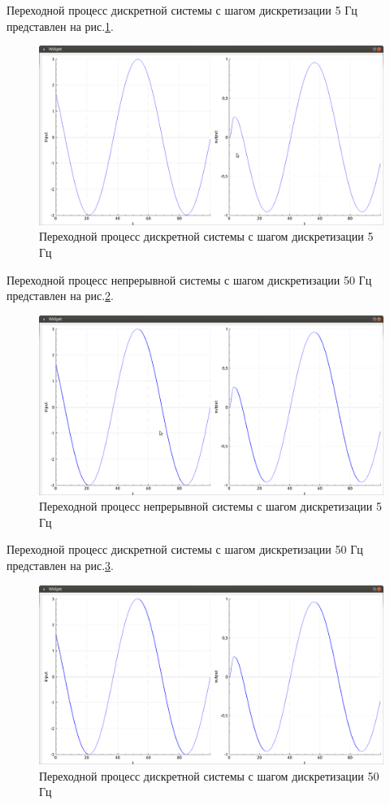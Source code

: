 \documentclass[14pt,a4paper]{extreport}
\begin{document}
Переходной процесс дискретной системы с шагом дискретизации 
5 Гц представлен на рис.\ref{fig:dis_5hz}.
\begin{figure}[H]
    \centering
    \includegraphics[width=160mm]{img/dis_5hz.png}
    \caption{Переходной процесс дискретной системы 
    с шагом дискретизации 5 Гц}
    \label{fig:dis_5hz}
\end{figure}

Переходной процесс непрерывной системы с шагом дискретизации 
50 Гц представлен на рис.\ref{fig:con_50hz}.
\begin{figure}[H]
    \centering
    \includegraphics[width=160mm]{img/con_50hz.png}
    \caption{Переходной процесс непрерывной системы с шагом дискретизации 5 Гц}
    \label{fig:con_50hz}
\end{figure}

Переходной процесс дискретной системы с шагом дискретизации 
50 Гц представлен на рис.\ref{fig:dis_50hz}.

\begin{figure}[H]
    \centering
    \includegraphics[width=160mm]{img/dis_50hz.png}
    \caption{Переходной процесс дискретной системы 
    с шагом дискретизации 50 Гц}
    \label{fig:dis_50hz}
\end{figure}
\end{document}
